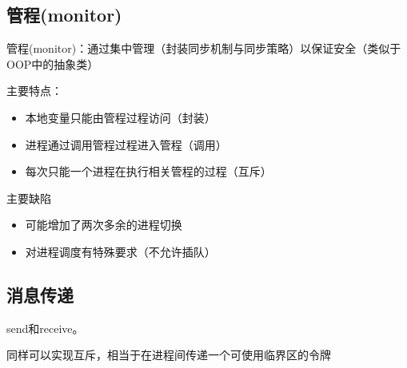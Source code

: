 \subsection{管程(monitor)}
管程(monitor)：通过集中管理（封装同步机制与同步策略）以保证安全（类似于OOP中的抽象类）

主要特点：
\begin{itemize}
    \item 本地变量只能由管程过程访问（封装）
    \item 进程通过调用管程过程进入管程（调用）
    \item 每次只能一个进程在执行相关管程的过程（互斥）
\end{itemize}
主要缺陷
\begin{itemize}
    \item 可能增加了两次多余的进程切换
    \item 对进程调度有特殊要求（不允许插队）
\end{itemize}

\subsection{消息传递}
send和receive。

同样可以实现互斥，相当于在进程间传递一个可使用临界区的令牌